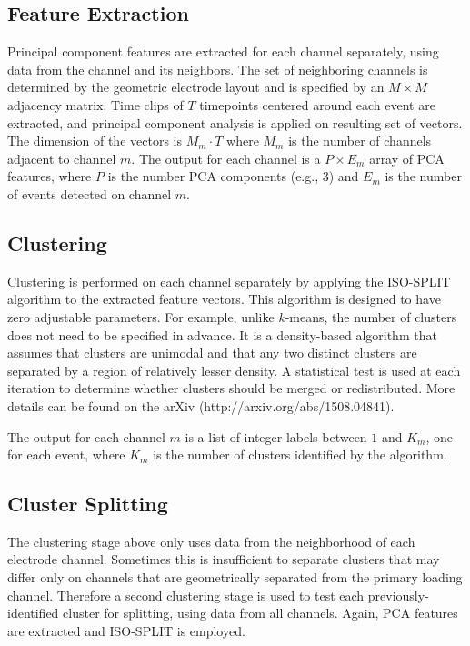 \documentclass[hidelinks,10pt]{article}
\begin{document}
\subsection {Feature Extraction}

Principal component features are extracted for each channel separately, using data from the channel and its neighbors. The set of neighboring channels is determined by the geometric electrode layout and is specified by an $M\times M$ adjacency matrix. Time clips of $T$ timepoints centered around each event are extracted, and principal component analysis is applied on resulting set of vectors. The dimension of the vectors is $M_m\cdot T$ where $M_m$ is the number of channels adjacent to channel $m$. The output for each channel is a $P\times E_m$ array of PCA features, where $P$ is the number PCA components (e.g., 3) and $E_m$ is the number of events detected on channel $m$.

\subsection {Clustering}

Clustering is performed on each channel separately by applying the ISO-SPLIT algorithm to the extracted feature vectors. This algorithm is designed to have zero adjustable parameters. For example, unlike $k$-means, the number of clusters does not need to be specified in advance. It is a density-based algorithm that assumes that clusters are unimodal and that any two distinct clusters are separated by a region of relatively lesser density. A statistical test is used at each iteration to determine whether clusters should be merged or redistributed. More details can be found on the arXiv (http://arxiv.org/abs/1508.04841).

The output for each channel $m$ is a list of integer labels between $1$ and $K_m$, one for each event, where $K_m$ is the number of clusters identified by the algorithm.

\subsection {Cluster Splitting}

The clustering stage above only uses data from the neighborhood of each electrode channel. Sometimes this is insufficient to separate clusters that may differ only on channels that are geometrically separated from the primary loading channel. Therefore a second clustering stage is used to test each previously-identified cluster for splitting, using data from all channels. Again, PCA features are extracted and ISO-SPLIT is employed.
\end{document}
